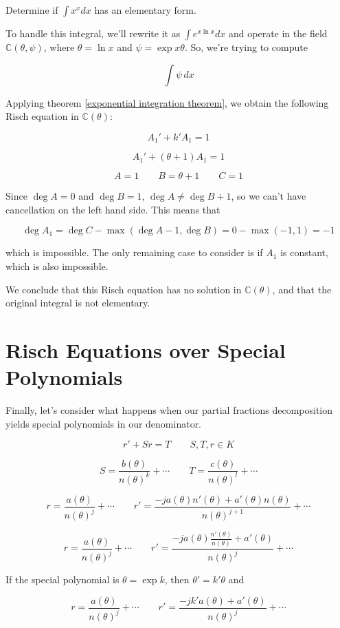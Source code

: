\example Determine if $\int x^x dx$ has an elementary form.

To handle this integral, we'll rewrite it as $\int e^{x \ln x} dx$
and operate in the field ${\mathbb C}(\theta, \psi)$, where
$\theta = \ln x$ and $\psi = \exp x\theta$.  So, we're
trying to compute

$$\int \psi\, dx$$

Applying theorem \ref{exponential integration theorem}, we
obtain the following Risch equation in
${\mathbb C}(\theta)$:

$$A_1' + k' A_1 = 1$$

$$A_1' + (\theta + 1) A_1 = 1$$

$$A=1 \qquad B=\theta +1 \qquad C=1$$

Since $\deg A = 0$ and $\deg B=1$, $\deg A \ne \deg B + 1$,
so we can't have cancellation on the left hand side.
This means that

$$\deg A_1 = \deg C - \max(\deg A - 1, \deg B) = 0 - \max(-1, 1) = -1$$

which is impossible.  The only remaining case to consider
is if $A_1$ is constant, which is also impossible.

We conclude that this Risch equation has no solution
in ${\mathbb C}(\theta)$, and that the original integral
is not elementary.

\endexample

\vfill\eject
\section{Risch Equations over Special Polynomials}

Finally, let's consider what happens when our partial
fractions decomposition yields special polynomials
in our denominator.

$$r' + S r = T \qquad S,T,r \in K$$

$$S = \frac{b(\theta)}{n(\theta)^k} + \cdots \qquad T = \frac{c(\theta)}{n(\theta)^l} + \cdots$$

$$r = \frac{a(\theta)}{n(\theta)^j} + \cdots  \qquad  r' = \frac{-ja(\theta)n'(\theta) + a'(\theta)n(\theta)}{n(\theta)^{j+1}} + \cdots$$

$$r = \frac{a(\theta)}{n(\theta)^j} + \cdots  \qquad  r' = \frac{-ja(\theta)\frac{n'(\theta)}{n(\theta)} + a'(\theta)}{n(\theta)^{j}} + \cdots$$

If the special polynomial is $\theta = \exp k$, then $\theta' = k' \theta$ and

$$r = \frac{a(\theta)}{n(\theta)^j} + \cdots  \qquad  r' = \frac{-j k' a(\theta) + a'(\theta)}{n(\theta)^{j}} + \cdots$$

